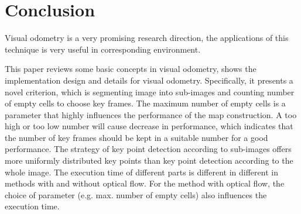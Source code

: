 \documentclass{easychair}
\begin{document}
\section{Conclusion}
Visual odometry is a very promising research direction, the applications of this technique is very useful in corresponding environment.

This paper reviews some basic concepts in visual odometry, shows the implementation design and details for visual odometry. Specifically, it presents a novel criterion, which is segmenting image into sub-images and counting number of empty cells to choose key frames. The maximum number of empty cells is a parameter that highly influences the performance of the map construction. A too high or too low number will cause decrease in performance, which indicates that the number of key frames should be kept in a suitable number for a good performance. The strategy of key point detection according to sub-images offers more uniformly distributed key points than key point detection according to the whole image. The execution time of different parts is different in different in methods with and without optical flow. For the method with optical flow, the choice of parameter (e.g. max. number of empty cells) also influences the execution time.
\end{document}
